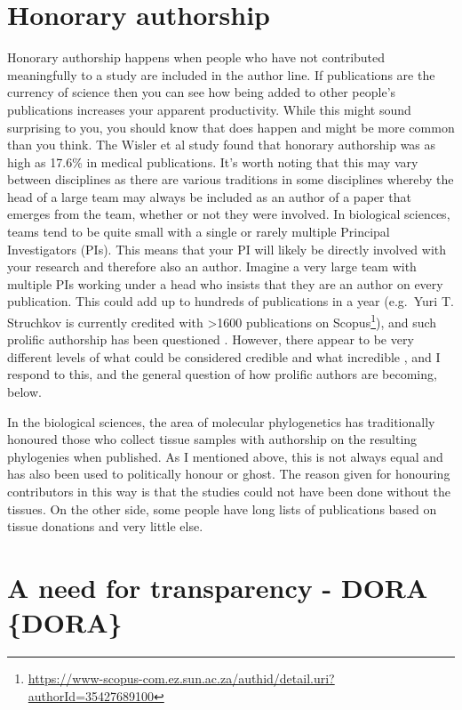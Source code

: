 \documentclass[
]{krantz}
\renewcommand{\href}[2]{#2\footnote{\url{#1}}}
\begin{document}
\hypertarget{honorary-authorship}{%
\section{Honorary authorship}\label{honorary-authorship}}

Honorary authorship happens when people who have not contributed meaningfully to a study are included in the author line. If publications are the currency of science then you can see how being added to other people's publications increases your apparent productivity. While this might sound surprising to you, you should know that does happen and might be more common than you think. The Wisler et al \citeyearpar{wislar2011honorary} study found that honorary authorship was as high as 17.6\% in medical publications. It's worth noting that this may vary between disciplines as there are various traditions in some disciplines whereby the head of a large team may always be included as an author of a paper that emerges from the team, whether or not they were involved. In biological sciences, teams tend to be quite small with a single or rarely multiple Principal Investigators (PIs). This means that your PI will likely be directly involved with your research and therefore also an author. Imagine a very large team with multiple PIs working under a head who insists that they are an author on every publication. This could add up to hundreds of publications in a year (e.g.~\href{https://www-scopus-com.ez.sun.ac.za/authid/detail.uri?authorId=35427689100}{Yuri T. Struchkov is currently credited with \textgreater1600 publications on Scopus}), and such prolific authorship has been questioned \citep[e.g.][]{rennie1994authorship}. However, there appear to be very different levels of what could be considered credible and what incredible \citep[e.g.~25 papers a year:][]{wager2015too}, and I respond to this, and the general question of how prolific authors are becoming, below.

In the biological sciences, the area of molecular phylogenetics has traditionally honoured those who collect tissue samples with authorship on the resulting phylogenies when published. As I mentioned above, this is not always equal and has also been used to politically honour or ghost. The reason given for honouring contributors in this way is that the studies could not have been done without the tissues. On the other side, some people have long lists of publications based on tissue donations and very little else.

\hypertarget{a-need-for-transparency---dora-dora}{%
\section{A need for transparency - DORA \{DORA\}}\label{a-need-for-transparency---dora-dora}}
\end{document}
